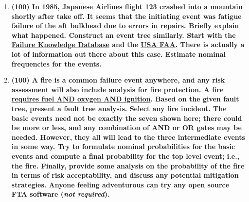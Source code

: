 \documentclass[11pt,a4paper]{article}
\begin{document}
\begin{enumerate}[leftmargin=*,topsep=0pt,font=\bfseries]
        
        
        
        
        
        
        
        
        
        
        \newpage
    \item\textbf{(100) In 1985, Japanese Airlines flight 123 crashed into a mountain shortly after take off. It seems that the initiating event was fatigue failure of the aft bulkhead due to errors in repairs. Briefly explain what happened. Construct an event tree similarly. Start with the \href{http://www.shippai.org/fkd/en/cfen/CB1071008.html}{Failure Knowledge Database} and the \href{https://lessonslearned.faa.gov/ll_adsearch_results.cfm?TabID=5}{USA FAA}. There is actually a lot of information out there about this case. Estimate nominal frequencies for the events.}
        \vspace{\baselineskip}
        
        
        
        
        
        
        
        
        
        
        
        
        
        
        
        
        
        
        
        
        
        
        
        
        
        
        
        
        
        
        
        
        
        
        
        \newpage
    \item\textbf{(100) A fire is a common failure event anywhere, and any risk assessment will also include analysis for fire protection. \href{https://images.sampletemplates.com/wp-content/uploads/2016/06/02114906/Fault-Tree-Analysis-Format.jpg}{A fire requires fuel AND oxygen AND ignition}. Based on the given fault tree, present a fault tree analysis. Select any fire incident. The basic events need not be exactly the seven shown here; there could be more or less, and any combination of AND or OR gates may be needed. However, they all will lead to the three intermediate events in some way. Try to formulate nominal probabilities for the basic events and compute a final probability for the top level event; i.e., the fire. Finally, provide some analysis on the probability of the fire in terms of risk acceptability, and discuss any potential mitigation strategies. Anyone feeling adventurous can try any open source FTA software (\textit{not required}).}
        \vspace{\baselineskip}
        

\end{enumerate}
\end{document}
